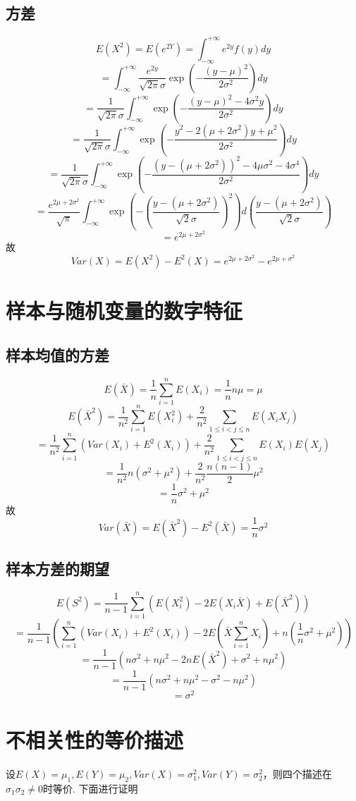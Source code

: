\documentclass{article}
\begin{document}
\begin{CJK}{UTF8}{gbsn}
\subsection{方差}
$$ E(X^{2})=E(e^{2Y})=\int_{-\infty}^{+\infty}e^{2y}f(y)dy$$
$$ =\int_{-\infty}^{+\infty}\frac{e^{2y}}{\sqrt{2\pi}\sigma}\exp(-\frac{(y-\mu)^{2}}{2\sigma^{2}})dy$$
$$ =\frac{1}{\sqrt{2\pi}\sigma}\int_{-\infty}^{+\infty}\exp(-\frac{(y-\mu)^{2}-4\sigma^{2}y}{2\sigma^{2}})dy$$
$$ =\frac{1}{\sqrt{2\pi}\sigma}\int_{-\infty}^{+\infty}\exp(-\frac{y^{2}-2(\mu+2\sigma^{2})y+\mu^{2}}{2\sigma^{2}})dy$$
$$ =\frac{1}{\sqrt{2\pi}\sigma}\int_{-\infty}^{+\infty}\exp(-\frac{(y-(\mu+2\sigma^{2}))^{2}-4\mu\sigma^{2}-4\sigma^{4}}{2\sigma^{2}})dy$$
$$ =\frac{e^{2\mu+2\sigma^{2}}}{\sqrt{\pi}}\int_{-\infty}^{+\infty}\exp(-(\frac{y-(\mu+2\sigma^{2})}{\sqrt{2}\sigma})^{2})d(\frac{y-(\mu+2\sigma^{2})}{\sqrt{2}\sigma})$$
$$ =e^{2\mu+2\sigma^{2}}$$
故
$$ Var(X)=E(X^{2})-E^{2}(X)=e^{2\mu+2\sigma^{2}}-e^{2\mu+\sigma^{2}}$$
\section{样本与随机变量的数字特征}
\subsection{样本均值的方差}
$$ E(\bar{X})=\frac{1}{n}\sum\limits_{i=1}^{n}E(X_{i})=\frac{1}{n}n\mu=\mu$$
$$ E(\bar{X}^{2})=\frac{1}{n^{2}}\sum\limits_{i=1}^{n}E(X_{i}^{2})+\frac{2}{n^{2}}\sum\limits_{1\leq i<j\leq n}E(X_{i}X_{j})$$
$$ =\frac{1}{n^{2}}\sum\limits_{i=1}^{n}(Var(X_{i})+E^{2}(X_{i}))+\frac{2}{n^{2}}\sum\limits_{1\leq i<j\leq n}E(X_{i})E(X_{j})$$
$$ =\frac{1}{n^{2}}n(\sigma^{2}+\mu^{2})+\frac{2}{n^{2}}\frac{n(n-1)}{2}\mu^{2}$$
$$ =\frac{1}{n}\sigma^{2}+\mu^{2}$$
故
$$ Var(\bar{X})=E(\bar{X}^{2})-E^{2}(\bar{X})=\frac{1}{n}\sigma^{2}$$
\subsection{样本方差的期望}
$$ E(S^{2})=\frac{1}{n-1}\sum\limits_{i=1}^{n}(E(X_{i}^{2})-2E(X_{i}\bar{X})+E(\bar{X}^{2}))$$
$$ =\frac{1}{n-1}(\sum\limits_{i=1}^{n}(Var(X_{i})+E^{2}(X_{i}))-2E(\bar{X}\sum\limits_{i=1}^{n}X_{i})+n(\frac{1}{n}\sigma^{2}+\mu^{2}))$$
$$ =\frac{1}{n-1}(n\sigma^{2}+n\mu^{2}-2nE(\bar{X}^{2})+\sigma^{2}+n\mu^{2})$$
$$ =\frac{1}{n-1}(n\sigma^{2}+n\mu^{2}-\sigma^{2}-n\mu^{2})$$
$$ =\sigma^{2}$$
\section{不相关性的等价描述}
设$E(X)=\mu_{1},E(Y)=\mu_{2},Var(X)=\sigma_{1}^{2},Var(Y)=\sigma_{2}^{2}$，则四个描述在$\sigma_{1}\sigma_{2}\neq 0$时等价. 下面进行证明

\end{CJK}
\end{document}
